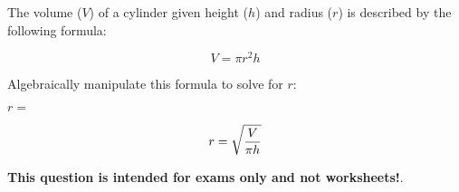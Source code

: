 

The volume ($V$) of a cylinder given height ($h$) and radius ($r$) is described by the following formula:

$$V = \pi r^2 h$$

Algebraically manipulate this formula to solve for $r$:

\vskip 20pt

$r = $







$$r = \sqrt{V \over {\pi h}}$$







{\bf This question is intended for exams only and not worksheets!}.



